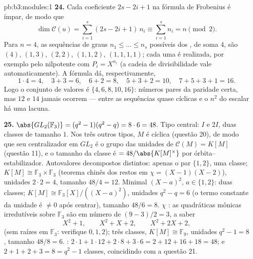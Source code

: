 \begin{solution}{pb:b3:modules:1}
\textbf{24.} Cada coeficiente $2s - 2i + 1$ na fórmula de Frobenius é ímpar, de
modo que
\[
\dim\mathcal C(u) = \sum_{i=1}^s(2s - 2i + 1)\,n_i
\equiv \sum_{i=1}^s n_i = n \pmod 2 .
\]
Para $n = 4$, as sequências de graus $n_1 \leq \dots
\leq n_s$ possíveis dos , de soma $4$, são $(4)$, $(1, 3)$, $(2, 2)$,
$(1, 1, 2)$, $(1, 1, 1, 1)$; cada uma é realizada, por exemplo pelo nilpotente com $P_i = X^{n_i}$
(a cadeia de divisibilidade vale automaticamente). A fórmula dá,
respectivamente,
\[
1\cdot4 = 4, \quad 3 + 3 = 6, \quad 6 + 2 = 8, \quad
5 + 3 + 2 = 10, \quad 7 + 5 + 3 + 1 = 16 .
\]
Logo o conjunto de valores é $\{4, 6, 8, 10, 16\}$: números pares da paridade certa, mas
$12$ e $14$ jamais ocorrem --- entre as sequências quase cíclicas
e o $n^2$ do escalar há uma lacuna.

\textbf{25.} $\abs{GL_2(\mathbb F_3)} = (q^2 - 1)(q^2 - q) =
8 \cdot 6 = 48$. Tipo central: $I$ e $2I$, duas classes de
tamanho $1$. Nos três outros tipos, $M$ é cíclica (questão 20), de
modo que seu centralizador em $GL_2$ é o grupo das unidades de $\mathcal C(M) = K[M]$
(questão 11), e o tamanho da classe é $=48/\abs{K[M]^\times}$ por órbita--estabilizador.
Autovalores decompostos distintos: apenas o par $\{1, 2\}$, uma classe; $K[M]
\cong \mathbb F_3 \times \mathbb F_3$
(teorema chinês dos restos em $\chi = (X-1)
(X-2)$), unidades $2 \cdot 2 = 4$, tamanho $48/4 = 12$.
Minimal $(X - a)^2$, $a \in \{1, 2\}$: duas classes; $K[M] \cong
\mathbb F_3[X]/((X-a)^2)$, unidades $q^2 - q = 6$ (o termo
constante da unidade é $\neq 0$ após centrar), tamanho $48/6 = 8$.
$\chi$ : as quadráticas mônicas irredutíveis sobre $\mathbb F_3$
são em número de $(9 - 3)/2 = 3$, a saber
\[
X^2 + 1, \qquad X^2 + X + 2, \qquad X^2 + 2X + 2,
\]
(sem raízes em $\mathbb F_3$: verifique $0, 1, 2$); três classes, $K[M] \cong \mathbb F_9$, unidades
$q^2 - 1 = 8$, tamanho $48/8 =
6$. : $2\cdot1 + 1\cdot12 + 2\cdot8 + 3\cdot6 =
2 + 12 + 16 + 18 = 48$; e $2 + 1 + 2 + 3 = 8 = q^2 - 1$ classes,
coincidindo com a questão 21.
\end{solution}
